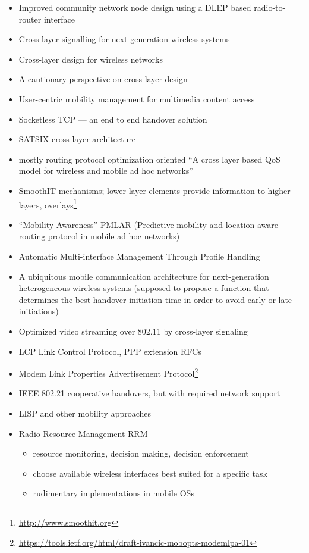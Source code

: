 \begin{itemize}
	\item Improved community network node design using a DLEP based radio-to-router interface \cite{6379143}
	\item Cross-layer signalling for next-generation wireless systems \cite{1200522}
	\item Cross-layer design for wireless networks \cite{1235598}
	\item A cautionary perspective on cross-layer design \cite{1404568}
	\item User-centric mobility management for multimedia content access \cite{bolla2011usercentric}
	\item Socketless \gls{TCP} --- an end to end handover solution \cite{1635680}
	\item SATSIX cross-layer architecture \cite{4656786}
	\item mostly routing protocol optimization oriented ``A cross layer based QoS model for wireless and mobile ad hoc networks'' \cite{krishna2007cross}
	\item SmoothIT mechanisms; lower layer elements provide information to higher layers, overlays\footnote{\url{http://www.smoothit.org}}  \cite{oechsner2009pushing}
	\item ``Mobility Awareness'' \cite{hummel2010mobilitaet} PMLAR (Predictive mobility and location-aware routing protocol in mobile ad hoc networks)
	\item Automatic Multi-interface Management Through Profile Handling \cite{Bonnin:2009:AMM:1503496.1503498}
	\item A ubiquitous mobile communication architecture for next-generation heterogeneous wireless systems \cite{1452832} (supposed to propose a function that determines the best handover initiation time in order to avoid early or late initiations)
	\item Optimized video streaming over 802.11 by cross-layer signaling \cite{1580941}
	\item LCP Link Control Protocol, PPP extension RFCs \cite{rfc1570,rfc1661}
 	\item Modem Link Properties Advertisement Protocol\footnote{\url{https://tools.ietf.org/html/draft-ivancic-mobopts-modemlpa-01}}
	\item IEEE 802.21 cooperative handovers, but with required network support
	\item LISP and other mobility approaches \cite{rfc6830}
	\item Radio Resource Management RRM
		\begin{itemize}
			\item resource monitoring, decision making, decision enforcement
			\item choose available wireless interfaces  best suited for a specific task
			\item rudimentary implementations in mobile OSs
		\end{itemize}
\end{itemize}




